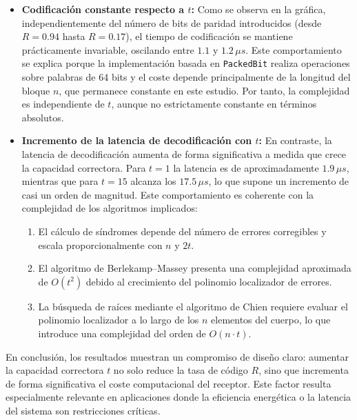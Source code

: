 \begin{itemize}

    \item \textbf{Codificación constante respecto a $t$:}  
    Como se observa en la gráfica, independientemente del número de bits de paridad introducidos (desde $R=0.94$ hasta $R=0.17$), el tiempo de codificación se mantiene prácticamente invariable, oscilando entre $1.1$ y $1.2\,\mu s$. Este comportamiento se explica porque la implementación basada en \texttt{PackedBit} realiza operaciones sobre palabras de 64 bits y el coste depende principalmente de la longitud del bloque $n$, que permanece constante en este estudio. Por tanto, la complejidad es independiente de $t$, aunque no estrictamente constante en términos absolutos.

    \item \textbf{Incremento de la latencia de decodificación con $t$:}  
    En contraste, la latencia de decodificación aumenta de forma significativa a medida que crece la capacidad correctora. Para $t=1$ la latencia es de aproximadamente $1.9\,\mu s$, mientras que para $t=15$ alcanza los $17.5\,\mu s$, lo que supone un incremento de casi un orden de magnitud. Este comportamiento es coherente con la complejidad de los algoritmos implicados:
    
    \begin{enumerate}
        \item El cálculo de síndromes depende del número de errores corregibles y escala proporcionalmente con $n$ y $2t$.
        \item El algoritmo de Berlekamp–Massey presenta una complejidad aproximada de $O(t^2)$ debido al crecimiento del polinomio localizador de errores.
        \item La búsqueda de raíces mediante el algoritmo de Chien requiere evaluar el polinomio localizador a lo largo de los $n$ elementos del cuerpo, lo que introduce una complejidad del orden de $O(n \cdot t)$.
    \end{enumerate}

\end{itemize}

En conclusión, los resultados muestran un compromiso de diseño claro: aumentar la capacidad correctora $t$ no solo reduce la tasa de código $R$, sino que incrementa de forma significativa el coste computacional del receptor. Este factor resulta especialmente relevante en aplicaciones donde la eficiencia energética o la latencia del sistema son restricciones críticas.


